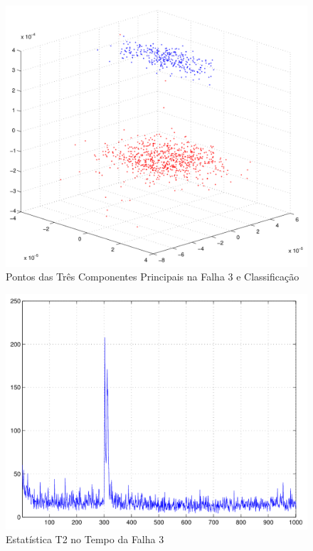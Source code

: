 \documentclass[journal]{IEEEtran}
\begin{document}
\begin{figure}[H]
	\centering
  \includegraphics[scale=0.6]{figs/fault3/pontos3D.pdf}
  \caption{Pontos das Três Componentes Principais na Falha 3 e Classificação}
	\label{fig:f3:3d}
\end{figure}

\begin{figure}[H]
	\centering
  \includegraphics[scale=0.6]{figs/fault3/T2_tempo.pdf}
  \caption{Estatística T2 no Tempo da Falha 3}
	\label{fig:f3:t2}
\end{figure}
\end{document}
